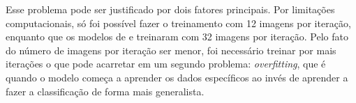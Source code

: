 Esse problema pode ser justificado por dois fatores principais. Por limitações computacionais, só foi possível fazer o treinamento com 12 imagens por iteração, enquanto que os modelos de  e  treinaram com 32 imagens por iteração. Pelo fato do número de imagens por iteração ser menor, foi necessário treinar por mais iterações o que pode acarretar em um segundo problema: \textit{overfitting}, que é quando o modelo começa a aprender os dados específicos ao invés de aprender a fazer a classificação de forma mais generalista.
